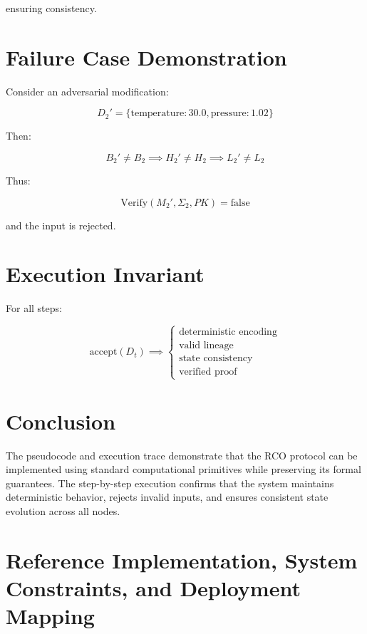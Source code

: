ensuring consistency.

\section{Failure Case Demonstration}

Consider an adversarial modification:

\begin{equation}
D_2' = \{\text{temperature}: 30.0, \text{pressure}: 1.02\}
\end{equation}

Then:

\begin{equation}
B_2' \neq B_2 \implies H_2' \neq H_2 \implies L_2' \neq L_2
\end{equation}

Thus:

\begin{equation}
\text{Verify}(M_2', \Sigma_2, PK) = \text{false}
\end{equation}

and the input is rejected.

\section{Execution Invariant}

For all steps:

\begin{equation}
\text{accept}(D_t) \implies
\begin{cases}
\text{deterministic encoding} \\
\text{valid lineage} \\
\text{state consistency} \\
\text{verified proof}
\end{cases}
\end{equation}

\section{Conclusion}

The pseudocode and execution trace demonstrate that the RCO protocol can be implemented using standard computational primitives while preserving its formal guarantees. The step-by-step execution confirms that the system maintains deterministic behavior, rejects invalid inputs, and ensures consistent state evolution across all nodes.

\section{Reference Implementation, System Constraints, and Deployment Mapping}

